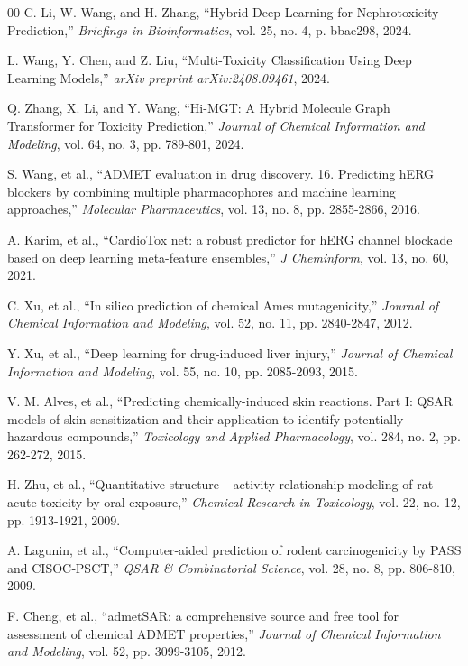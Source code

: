 \documentclass[conference]{IEEEtran}
\begin{document}
\begin{thebibliography}{00}
C. Li, W. Wang, and H. Zhang, ``Hybrid Deep Learning for Nephrotoxicity Prediction,'' \textit{Briefings in Bioinformatics}, vol. 25, no. 4, p. bbae298, 2024.

L. Wang, Y. Chen, and Z. Liu, ``Multi-Toxicity Classification Using Deep Learning Models,'' \textit{arXiv preprint arXiv:2408.09461}, 2024.

Q. Zhang, X. Li, and Y. Wang, ``Hi-MGT: A Hybrid Molecule Graph Transformer for Toxicity Prediction,'' \textit{Journal of Chemical Information and Modeling}, vol. 64, no. 3, pp. 789-801, 2024.

S. Wang, et al., “ADMET evaluation in drug discovery. 16. Predicting hERG blockers by combining multiple pharmacophores and machine learning approaches,” \textit{Molecular Pharmaceutics}, vol. 13, no. 8, pp. 2855-2866, 2016.

A. Karim, et al., “CardioTox net: a robust predictor for hERG channel blockade based on deep learning meta-feature ensembles,” \textit{J Cheminform}, vol. 13, no. 60, 2021.

C. Xu, et al., “In silico prediction of chemical Ames mutagenicity,” \textit{Journal of Chemical Information and Modeling}, vol. 52, no. 11, pp. 2840-2847, 2012.

Y. Xu, et al., “Deep learning for drug-induced liver injury,” \textit{Journal of Chemical Information and Modeling}, vol. 55, no. 10, pp. 2085-2093, 2015.

V. M. Alves, et al., “Predicting chemically-induced skin reactions. Part I: QSAR models of skin sensitization and their application to identify potentially hazardous compounds,” \textit{Toxicology and Applied Pharmacology}, vol. 284, no. 2, pp. 262-272, 2015.

H. Zhu, et al., “Quantitative structure− activity relationship modeling of rat acute toxicity by oral exposure,” \textit{Chemical Research in Toxicology}, vol. 22, no. 12, pp. 1913-1921, 2009.

A. Lagunin, et al., “Computer‐aided prediction of rodent carcinogenicity by PASS and CISOC‐PSCT,” \textit{QSAR & Combinatorial Science}, vol. 28, no. 8, pp. 806-810, 2009.

F. Cheng, et al., “admetSAR: a comprehensive source and free tool for assessment of chemical ADMET properties,” \textit{Journal of Chemical Information and Modeling}, vol. 52, pp. 3099-3105, 2012.


\end{thebibliography}
\end{document}
